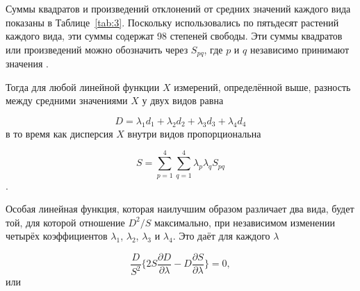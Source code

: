 \documentclass[12pt]{article}
\begin{document}
Суммы квадратов и произведений отклонений от средних значений каждого вида показаны в Таблице~\ref{tab:3}. Поскольку использовались по пятьдесят растений каждого вида, эти суммы содержат 98 степеней свободы. Эти суммы квадратов или произведений можно обозначить через $S_{pq}$, где $p$ и $q$ независимо принимают значения .


Тогда для любой линейной функции $X$ измерений, определённой выше, разность между средними значениями $X$ у двух видов равна

\[
D = \lambda_{1} d_{1} + \lambda_{2} d_{2} + \lambda_{3} d_{3} + \lambda_{4} d_{4}
\] в то время как дисперсия $X$ внутри видов пропорциональна

\[
S = \sum_{p=1}^{4}\sum_{q=1}^{4} \lambda_{p} \lambda_{q} S_{pq}
\].


Особая линейная функция, которая наилучшим образом различает два вида, будет той, для которой отношение $D^2/S$ максимально, при независимом изменении четырёх коэффициентов $\lambda_{1}$, $\lambda_{2}$, $\lambda_{3}$ и $\lambda_{4}$. Это даёт для каждого $\lambda$


\[
\frac{D}{S^2} \biggl\{ 2S \frac{\partial D}{\partial \lambda} - D \frac{\partial S}{\partial \lambda} \biggl\} = 0,
\] или
\end{document}
